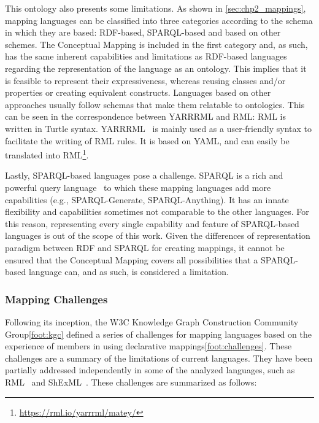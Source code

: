 This ontology also presents some limitations. As shown in \cref{sec:chp2_mappings}, mapping languages can be classified into three categories according to the schema in which they are based: RDF-based, SPARQL-based and based on other schemes. The Conceptual Mapping is included in the first category and, as such, has the same inherent capabilities and limitations as RDF-based languages regarding the representation of the language as an ontology. This implies that it is feasible to represent their expressiveness, whereas reusing classes and/or properties or creating equivalent constructs. Languages based on other approaches usually follow schemas that make them relatable to ontologies. This can be seen in the correspondence between YARRRML and RML: RML is written in Turtle syntax. YARRRML~\citep{Heyvaert2018yarrrml} is mainly used as a user-friendly syntax to facilitate the writing of RML rules. It is based on YAML, and can easily be translated into RML\footnote{\url{https://rml.io/yarrrml/matey/}}. 

Lastly, SPARQL-based languages pose a challenge. SPARQL is a rich and powerful query language~\citep{perez2009semantics} to which these mapping languages add more capabilities (e.g., SPARQL-Generate, SPARQL-Anything). It has an innate flexibility and capabilities sometimes not comparable to the other languages. For this reason, representing every single capability and feature of SPARQL-based languages is out of the scope of this work. Given the differences of representation paradigm between RDF and SPARQL for creating mappings, it cannot be ensured that the Conceptual Mapping covers all possibilities that a SPARQL-based language can, and as such, is considered a limitation.


\subsubsection{Mapping Challenges}
\label{sec:chp4_mapping_challenges}

Following its inception, the W3C Knowledge Graph Construction Community Group\cref{foot:kgc} defined a series of challenges for mapping languages based on the experience of members in using declarative mappings\cref{foot:challenges}. These challenges are a summary of the limitations of current languages. They have been partially addressed independently in some of the analyzed languages, such as RML~\citep{delva2021rml-fields} and ShExML~\citep{garcia2021shexml-challenges}. These challenges are summarized as follows:

